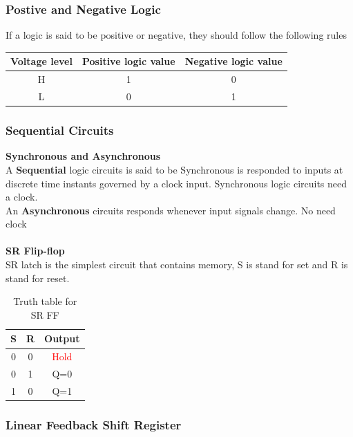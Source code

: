 \documentclass{article}
\begin{document}
\subsubsection{Postive and Negative Logic}
If a logic is said to be positive or negative, they should follow the following rules
\begin{table}[h]
    \centering
    \begin{tabular}{|c|c|c|}
        \hline
        Voltage level & Positive logic value& Negative logic value \\
        \hline
        H & 1 & 0\\
        \hline
        L & 0 & 1\\
        \hline
    \end{tabular}
\end{table}

\subsubsection{Sequential Circuits}
\textbf{Synchronous and Asynchronous} \\
A \textbf{Sequential} logic circuits is said to be Synchronous is responded to inputs at discrete time instants governed by a clock input. Synchronous logic circuits need a clock. \\
An \textbf{Asynchronous} circuits responds whenever input signals change. No need clock\\
\\
\textbf{SR Flip-flop} \\
SR latch is the simplest circuit that contains memory, S is stand for set and R is stand for reset.
\begin{table}[h]
    \centering
    \begin{tabular}{|c|c|c|}
    \hline
         S & R & Output  \\
         \hline
         0 & 0 & \textcolor{red}{Hold} \\
         \hline
         0 & 1 & Q=0 \\
         \hline
         1 & 0 & Q=1 \\
         \hline
    \end{tabular}
    \caption{Truth table for SR FF}
\end{table}

\subsubsection{Linear Feedback Shift Register}
\end{document}
